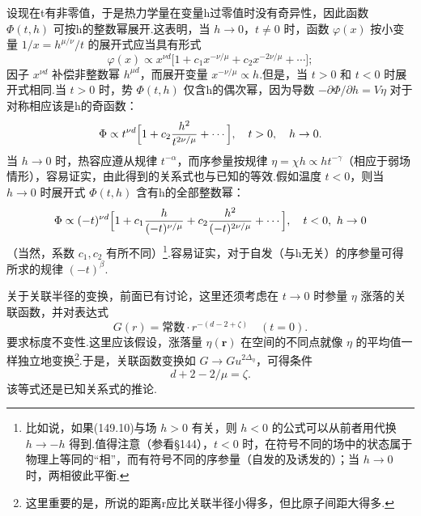 设现在t有非零值，于是热力学量在变量h过零值时没有奇异性，因此函数 $\Phi(t,h)$ 可按h的整数幂展开.这表明，当 $h\to0$，$t\neq0$ 时，函数 $\varphi(x)$ 按小变量 $1/x=h^{\mu/\nu}/t$ 的展开式应当具有形式
\begin{equation*}
  \varphi(x)\propto x^{\nu d}
  \bigl[1+c_1x^{-\nu/\mu}+c_2x^{-2\nu/\mu}+\cdots\bigr];
\end{equation*}
因子 $x^{\nu d}$ 补偿非整数幂 $h^{\mu d}$，而展开变量 $x^{-\nu/\mu}\propto h$.但是，当 $t>0$ 和 $t<0$ 时展开式相同.当 $t>0$ 时，势 $\Phi(t,h)$ 仅含h的偶次幂，因为导数 $-\partial\Phi/\partial h=V\eta$ 对于对称相应该是h的奇函数：
\begin{equation}
  \Phi\propto t^{\nu d}\Bigl[1+c_2\frac{h^2}{t^{2\nu/\mu}}+\cdots\Bigr],
  \quad t>0,\quad h\to0.
\end{equation}
当 $h\to0$ 时，热容应遵从规律 $t^{-\alpha}$，而序参量按规律 $\eta=\chi h\propto ht^{-\gamma}$（相应于弱场情形），容易证实，由此得到的关系式也与已知的等效.假如温度 $t<0$，则当 $h\to0$ 时展开式 $\Phi(t,h)$ 含有h的全部整数幂：
\begin{equation}
  \Phi\propto(-t)^{\nu d}\Bigl[1+c_1\frac{h}{(-t)^{\nu/\mu}}
  +c_2\frac{h^2}{(-t)^{2\nu/\mu}}+\cdots\Bigr],
  \quad t<0,\ h\to0
\end{equation}
（当然，系数 $c_1,c_2$ 有所不同）\footnote{比如说，如果(149.10)与场 $h>0$ 有关，则 $h<0$ 的公式可以从前者用代换 $h\to-h$ 得到.值得注意（参看§144），$t<0$ 时，在符号不同的场中的状态属于物理上等同的“相”，而有符号不同的序参量（自发的及诱发的）；当 $h\to0$ 时，两相彼此平衡.}.容易证实，对于自发（与h无关）的序参量可得所求的规律 $(-t)^{\beta}$.

关于关联半径的变换，前面已有讨论，这里还须考虑在 $t\to0$ 时参量 $\eta$ 涨落的关联函数，并对表达式
\begin{equation*}
  G(r)=\text{常数}\cdot r^{-(d-2+\zeta)}\quad(t=0).
\end{equation*}
要求标度不变性.这里应该假设，涨落量 $\eta(\boldsymbol{r})$ 在空间的不同点就像 $\eta$ 的平均值一样独立地变换\footnote{这里重要的是，所说的距离r应比关联半径小得多，但比原子间距大得多.}.于是，关联函数变换如 $G\to Gu^{2\Delta_\eta}$，可得条件
\begin{equation}
  d+2-2/\mu=\zeta.
\end{equation}
该等式还是已知关系式的推论.

